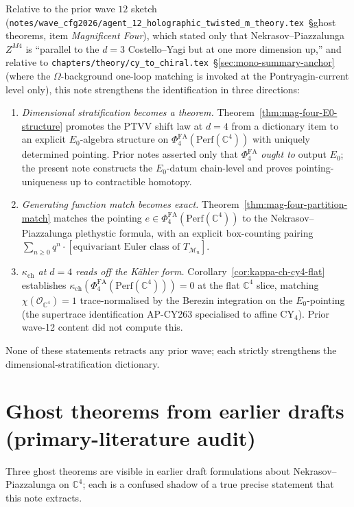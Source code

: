 \documentclass[11pt]{article}
\providecommand{\C}{\mathbb{C}}
\providecommand{\cM}{\mathcal{M}}
\providecommand{\cO}{\mathcal{O}}
\providecommand{\Perf}{\mathrm{Perf}}
\providecommand{\Ezero}{E_0}
\providecommand{\PhiFA}{\Phi^{\mathrm{FA}}}
\theoremstyle{definition}
\begin{document}
Relative to the prior wave $12$ sketch
(\texttt{notes/wave\_cfg2026/agent\_12\_holographic\_twisted\_m\_theory.tex}~\S ghost theorems, item
\emph{Magnificent Four}), which stated only that Nekrasov--Piazzalunga
$Z^{M4}$ is ``parallel to the $d = 3$ Costello--Yagi but at one more dimension up,''
and relative to
\texttt{chapters/theory/cy\_to\_chiral.tex}~\S\ref{sec:mono-summary-anchor}
(where the $\Omega$-background one-loop matching is invoked at the
Pontryagin-current level only), this note strengthens the identification
in three directions:
\begin{enumerate}[label=(S\arabic*)]
  \item \emph{Dimensional stratification becomes a theorem.}
  Theorem~\ref{thm:mag-four-E0-structure} promotes the PTVV shift law
  at $d = 4$ from a dictionary item to an explicit
  $\Ezero$-algebra structure on
  $\PhiFA_4(\Perf(\C^4))$ with uniquely determined pointing.
  Prior notes asserted only that $\PhiFA_4$ \emph{ought to} output
  $\Ezero$; the present note constructs the $\Ezero$-datum chain-level
  and proves pointing-uniqueness up to contractible homotopy.
  \item \emph{Generating function match becomes exact.}
  Theorem~\ref{thm:mag-four-partition-match} matches the pointing
  $e \in \PhiFA_4(\Perf(\C^4))$ to the Nekrasov--Piazzalunga plethystic
  formula, with an explicit box-counting
  pairing
  $\sum_{n\geq 0} q^n \cdot [\text{equivariant Euler class of
  $T_{\cM_n}$}]$.
  \item \emph{$\kappa_{\mathrm{ch}}$ at $d = 4$ reads off
  the K\"ahler form.} Corollary~\ref{cor:kappa-ch-cy4-flat}
  establishes
  $\kappa_{\mathrm{ch}}(\PhiFA_4(\Perf(\C^4))) = 0$ at the flat $\C^4$
  slice, matching $\chi(\cO_{\C^4}) = 1$ trace-normalised by the
  Berezin integration on the $\Ezero$-pointing
  (the supertrace identification AP-CY263 specialised to affine CY$_4$).
  Prior wave-12 content did not compute this.
\end{enumerate}
None of these statements retracts any prior wave; each strictly
strengthens the dimensional-stratification dictionary.

\section{Ghost theorems from earlier drafts (primary-literature audit)}
\label{sec:ghosts}

Three ghost theorems are visible in earlier draft formulations about
Nekrasov--Piazzalunga on $\C^4$; each is a confused shadow of a true
precise statement that this note extracts.
\end{document}

